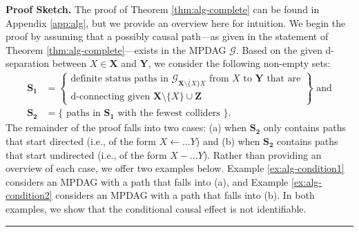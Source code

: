 \documentclass[11pt]{article}
\newcommand{\BlackBox}{\rule{1.5ex}{1.5ex}}  %
\newcommand{\mb}[1]{\mathbf{#1}}
\newcommand{\g}[1][G]{\mathcal{#1}}
\newenvironment{proofsketch}{\noindent \textbf{Proof Sketch.}}{\hfill\BlackBox\\}
\begin{document}
\begin{proofsketch}
    The proof of Theorem \ref{thm:alg-complete} can be found in Appendix \ref{app:alg}, but we provide an overview here for intuition. We begin the proof by assuming that a possibly causal path---as given in the statement of Theorem \ref{thm:alg-complete}---exists in the MPDAG $\g$. Based on the given d-separation between $X \in \mb{X}$ and $\mb{Y}$, we consider the following non-empty sets:
    \begin{align}
        \mb{S_1} &= \left\{\begin{array}{ll}
                        \text{definite status paths in $\g_{\overline{\mb{X} \setminus \{X\}} \underline{X}}$ from $X$ to $\mb{Y}$ that are} \\
                        \text{d-connecting given $\mb{X} \setminus \{X\} \cup \mb{Z}$}
                    \end{array}\right\}\text{ and} \nonumber\\
        \mb{S_2} &= \{ \text{ paths in $\mb{S_1}$ with the fewest colliders } \}. \label{thm:alg-complete-s2}
    \end{align}
    The remainder of the proof falls into two cases: (a) when $\mb{S_2}$ only contains paths that start directed (i.e., of the form $X \gets \dots Y$) and (b) when $\mb{S_2}$ contains paths that start undirected (i.e., of the form $X - \dots Y$). Rather than providing an overview of each case, we offer two examples below. Example \ref{ex:alg-condition1} considers an MPDAG with a path that falls into (a), and Example \ref{ex:alg-condition2} considers an MPDAG with a path that falls into (b). In both examples, we show that the conditional causal effect is not identifiable.
\end{proofsketch}


\end{document}
